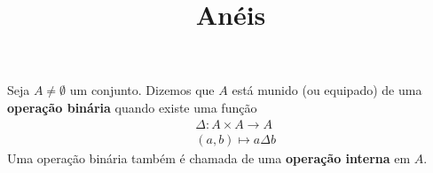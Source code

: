 \documentclass{beamer}
\title{An\'eis}
\author[\autor]{\autor}
\institute[\instituto]{\instituto}
\date{}
\begin{document}
    \begin{frame}
        \maketitle
    \end{frame}


    \begin{frame}
        \begin{definicao}
            Seja $A \ne \emptyset$ um conjunto. \pause Dizemos que $A$ est{\'a} munido \pause (ou equipado) \pause de uma \textbf{opera{\c c}{\~a}o bin{\'a}ria} \pause quando existe uma fun{\c c}{\~a}o\pause
            \begin{align*}
                &\Delta : A \times A \to A\\
                &(a,b) \longmapsto a\Delta b
            \end{align*}
            Uma opera{\c c}{\~a}o bin{\'a}ria tamb{\'e}m {\'e} chamada de uma \textbf{opera{\c c}{\~a}o interna} em $A$.\pause
        \end{definicao}
    \end{frame}
\end{document}
